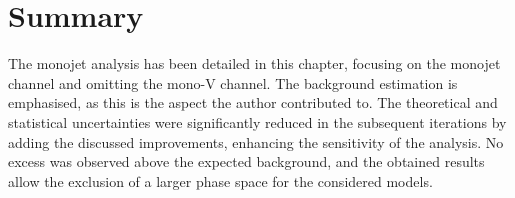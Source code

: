 \section{Summary}

The monojet analysis has been detailed in this chapter, focusing on the monojet channel and omitting the mono-V channel. The background estimation is emphasised, as this is the aspect the author contributed to. The theoretical and statistical uncertainties were significantly reduced in the subsequent iterations by adding the discussed improvements, enhancing the sensitivity of the analysis. No excess was observed above the expected background, and the obtained results allow the exclusion of a larger phase space for the considered models.

\clearpage{\pagestyle{empty}\cleardoublepage}
